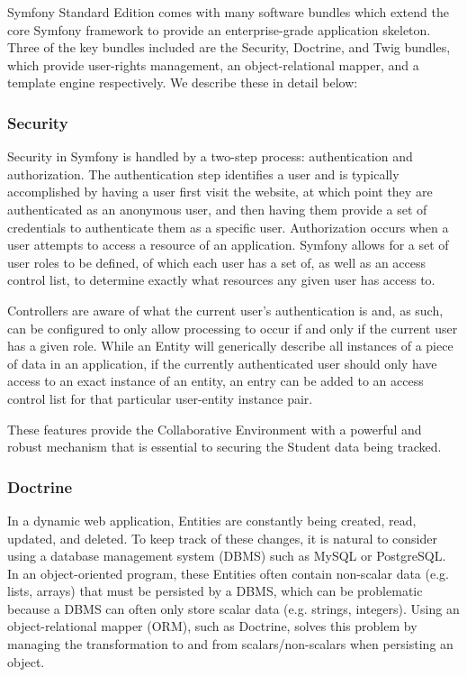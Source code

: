 Symfony Standard Edition comes with many software bundles which extend the core Symfony framework to provide an enterprise-grade application skeleton. Three of the key bundles included are the Security, Doctrine, and Twig bundles, which provide user-rights management, an object-relational mapper, and a template engine respectively. We describe these in detail below:

\subsubsection{Security}
Security in Symfony is handled by a two-step process: authentication and authorization. The authentication step identifies a user and is typically accomplished by having a user first visit the website, at which point they are authenticated as an anonymous user, and then having them provide a set of credentials to authenticate them as a specific user. Authorization occurs when a user attempts to access a resource of an application. Symfony allows for a set of user roles to be defined, of which each user has a set of, as well as an access control list, to determine exactly what resources any given user has access to.

Controllers are aware of what the current user's authentication is and, as such, can be configured to only allow processing to occur if and only if the current user has a given role. While an Entity will generically describe all instances of a piece of data in an application, if the currently authenticated user should only have access to an exact instance of an entity, an entry can be added to an access control list for that particular user-entity instance pair.

These features provide the Collaborative Environment with a powerful and robust mechanism that is essential to securing the Student data being tracked.

\subsubsection{Doctrine}
In a dynamic web application, Entities are constantly being created, read, updated, and deleted. To keep track of these changes, it is natural to consider using a database management system (DBMS) such as MySQL or PostgreSQL. In an object-oriented program, these Entities often contain non-scalar data (e.g. lists, arrays) that must be persisted by a DBMS, which can be problematic because a DBMS can often only store scalar data (e.g. strings, integers). Using an object-relational mapper (ORM), such as Doctrine, solves this problem by managing the transformation to and from scalars/non-scalars when persisting an object.

